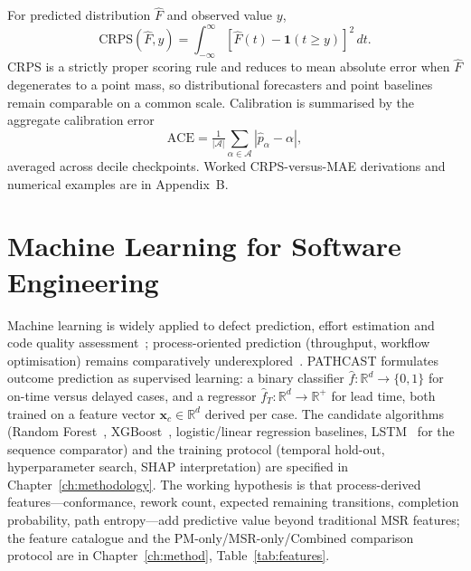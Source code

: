 \begin{definition}[CRPS]
\label{def:crps}
For predicted distribution $\hat{F}$ and observed value $y$,
\begin{equation}
\label{eq:crps}
\text{CRPS}(\hat{F}, y) = \int_{-\infty}^{\infty}
   [\hat{F}(t) - \mathbf{1}(t \geq y)]^2 \, dt.
\end{equation}
CRPS is a strictly proper scoring rule and reduces to mean absolute error
when $\hat{F}$ degenerates to a point mass, so distributional forecasters
and point baselines remain comparable on a common scale. Calibration is
summarised by the aggregate calibration error
\begin{equation}
\label{eq:ace}
\text{ACE} = \tfrac{1}{|\mathcal{A}|}
   \sum_{\alpha \in \mathcal{A}}|\hat{p}_\alpha - \alpha|,
\end{equation}
averaged across decile checkpoints. Worked CRPS-versus-MAE derivations
and numerical examples are in Appendix~B.
\end{definition}


\section{Machine Learning for Software Engineering}
\label{sec:ml-se}

Machine learning is widely applied to defect prediction, effort
estimation and code quality assessment~\cite{Wahono2015, pachouly2022};
process-oriented prediction (throughput, workflow optimisation) remains
comparatively underexplored~\cite{kotti2023}. PATHCAST formulates outcome
prediction as supervised learning: a binary classifier
$\hat{f}\colon \mathbb{R}^d \to \{0,1\}$ for on-time versus delayed cases,
and a regressor $\hat{f}_T\colon \mathbb{R}^d \to \mathbb{R}^+$ for lead
time, both trained on a feature vector $\mathbf{x}_c \in \mathbb{R}^d$
derived per case. The candidate algorithms (Random
Forest~\cite{breiman2001random}, XGBoost~\cite{chen2016xgboost},
logistic/linear regression baselines, LSTM~\cite{tax2017} for the
sequence comparator) and the training protocol (temporal hold-out,
hyperparameter search, SHAP interpretation) are specified in
Chapter~\ref{ch:methodology}. The working hypothesis is that
process-derived features---conformance, rework count, expected remaining
transitions, completion probability, path entropy---add predictive value
beyond traditional MSR features; the feature catalogue and the
PM-only/MSR-only/Combined comparison protocol are in Chapter~\ref{ch:method},
Table~\ref{tab:features}.


